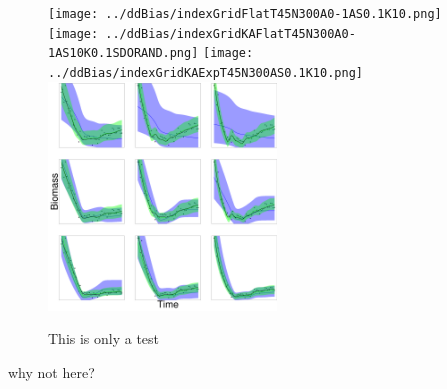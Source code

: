 %
\begin{figure}[h!]
\texttt{[image: ../ddBias/indexGridFlatT45N300A0-1AS0.1K10.png]}
\texttt{[image: ../ddBias/indexGridKAFlatT45N300A0-1AS10K0.1SDORAND.png]}
\texttt{[image: ../ddBias/indexGridKAExpT45N300AS0.1K10.png]}
\includegraphics[width=0.54\textwidth]{../ddBias/indexGridKAExpT45N300A0-1AS10K0.1.png}
\vspace{-1.5cm}
\caption{This is only a test}
\label{rpSpace}
\end{figure}

%
why not here?

